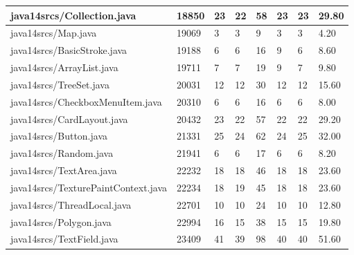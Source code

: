 \begin{tabular}{|l|l|l|l|l|l|l|l|}
\hline
java14srcs/Collection.java                         & 18850       & 23        & 22        & 58        & 23        & 23        & 29.80     \\
\hline
java14srcs/Map.java                                & 19069       & 3         & 3         & 9         & 3         & 3         & 4.20      \\
\hline
java14srcs/BasicStroke.java                        & 19188       & 6         & 6         & 16        & 9         & 6         & 8.60      \\
\hline
java14srcs/ArrayList.java                          & 19711       & 7         & 7         & 19        & 9         & 7         & 9.80      \\
\hline
java14srcs/TreeSet.java                            & 20031       & 12        & 12        & 30        & 12        & 12        & 15.60     \\
\hline
java14srcs/CheckboxMenuItem.java                   & 20310       & 6         & 6         & 16        & 6         & 6         & 8.00      \\
\hline
java14srcs/CardLayout.java                         & 20432       & 23        & 22        & 57        & 22        & 22        & 29.20     \\
\hline
java14srcs/Button.java                             & 21331       & 25        & 24        & 62        & 24        & 25        & 32.00     \\
\hline
java14srcs/Random.java                             & 21941       & 6         & 6         & 17        & 6         & 6         & 8.20      \\
\hline
java14srcs/TextArea.java                           & 22232       & 18        & 18        & 46        & 18        & 18        & 23.60     \\
\hline
java14srcs/TexturePaintContext.java                & 22234       & 18        & 19        & 45        & 18        & 18        & 23.60     \\
\hline
java14srcs/ThreadLocal.java                        & 22701       & 10        & 10        & 24        & 10        & 10        & 12.80     \\
\hline
java14srcs/Polygon.java                            & 22994       & 16        & 15        & 38        & 15        & 15        & 19.80     \\
\hline
java14srcs/TextField.java                          & 23409       & 41        & 39        & 98        & 40        & 40        & 51.60     \\

\end{tabular}
